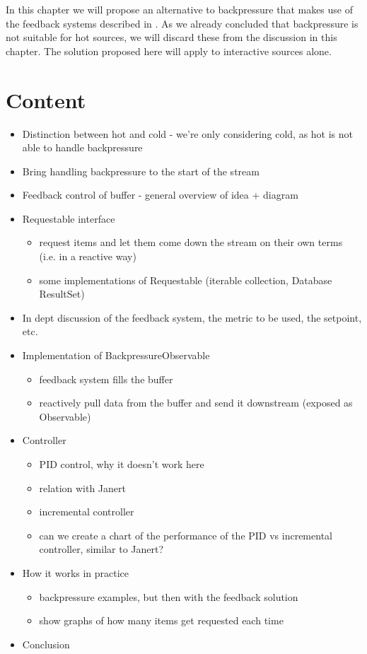 In this chapter we will propose an alternative to backpressure that makes use of the feedback systems described in . As we already concluded that backpressure is not suitable for hot sources, we will discard these from the discussion in this chapter. The solution proposed here will apply to interactive sources alone.



\clearpage
\section*{Content}
\begin{itemize}
	\item[\checkmark] Distinction between hot and cold - we're only considering cold, as hot is not able to handle backpressure
	\item[\checkmark] Bring handling backpressure to the start of the stream
	\item[\checkmark] Feedback control of buffer - general overview of idea + diagram
	\item[\checkmark] Requestable interface
		\begin{itemize}
			\item[\checkmark] request items and let them come down the stream on their own terms (i.e. in a reactive way)
			\item[\checkmark] some implementations of Requestable (iterable collection, Database ResultSet)
		\end{itemize}
	\item[\checkmark] In dept discussion of the feedback system, the metric to be used, the setpoint, etc.
	\item Implementation of BackpressureObservable
		\begin{itemize}
			\item feedback system fills the buffer
			\item reactively pull data from the buffer and send it downstream (exposed as Observable)
		\end{itemize}
	\item Controller
		\begin{itemize}
			\item PID control, why it doesn't work here
			\item relation with Janert
			\item incremental controller
			\item can we create a chart of the performance of the PID vs incremental controller, similar to Janert?
		\end{itemize}
	\item How it works in practice
		\begin{itemize}
			\item backpressure examples, but then with the feedback solution
			\item show graphs of how many items get requested each time
		\end{itemize}
	\item Conclusion
\end{itemize}